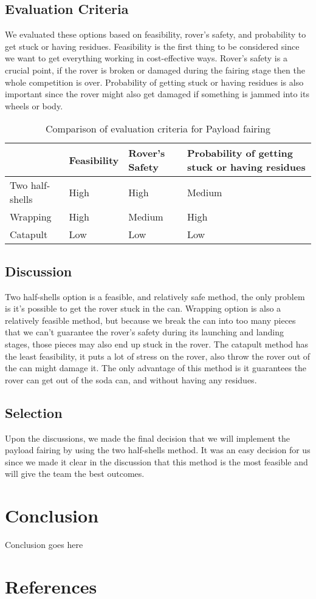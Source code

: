 \documentclass[10pt,letterpaper,onecolumn,journal]{IEEEtran}
\begin{document}
\subsection{Evaluation Criteria}
We evaluated these options based on feasibility, rover's safety, and probability to get stuck or having residues. Feasibility is the first thing to be considered since we want to get everything working in cost-effective ways. Rover's safety is a crucial point, if the rover is broken or damaged during the fairing stage then the whole competition is over. Probability of getting stuck or having residues is also important since the rover might also get damaged if something is jammed into its wheels or body. 


\begin{table}[h!]
	\centering
	\caption{Comparison of evaluation criteria for Payload fairing}
	\label{tab:table1}
	\begin{tabular}{l|l|l|l}
		& Feasibility & Rover's Safety & Probability of getting stuck or having residues \\
		\hline
		Two half-shells       & High & High       & Medium  \\
		\hline
		Wrapping		      & High  &  Medium   & High \\
		\hline
		Catapult			  & Low  & Low  & Low  \\
	\end{tabular}
\end{table}

\subsection{Discussion}
Two half-shells option is a feasible, and relatively safe method, the only problem is it's possible to get the rover stuck in the can. Wrapping option is also a relatively feasible method, but because we break the can into too many pieces that we can't guarantee the rover's safety during its launching and landing stages, those pieces may also end up stuck in the rover. The catapult method has the least feasibility, it puts a lot of stress on the rover, also throw the rover out of the can might damage it. The only advantage of this method is it guarantees the rover can get out of the soda can, and without having any residues.  

\subsection{Selection}
Upon the discussions, we made the final decision that we will implement the payload fairing by using the two half-shells method. It was an easy decision for us since we made it clear in the discussion that this method is the most feasible and will give the team the best outcomes. 

\section{Conclusion}

Conclusion goes here

\section{References}



\end{document}
